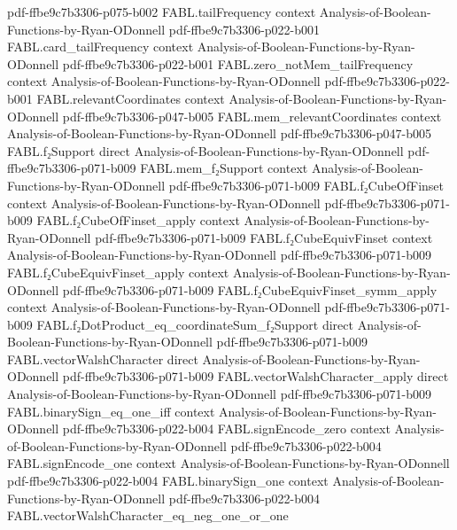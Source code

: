 \begin{theorem}
  {pdf-ffbe9c7b3306-p075-b002}
\proofstep
  {FABL.tailFrequency}
  {context}
  {Analysis-of-Boolean-Functions-by-Ryan-ODonnell}
  {pdf-ffbe9c7b3306-p022-b001}
\proofstep
  {FABL.card_tailFrequency}
  {context}
  {Analysis-of-Boolean-Functions-by-Ryan-ODonnell}
  {pdf-ffbe9c7b3306-p022-b001}
\proofstep
  {FABL.zero_notMem_tailFrequency}
  {context}
  {Analysis-of-Boolean-Functions-by-Ryan-ODonnell}
  {pdf-ffbe9c7b3306-p022-b001}
\proofstep
  {FABL.relevantCoordinates}
  {context}
  {Analysis-of-Boolean-Functions-by-Ryan-ODonnell}
  {pdf-ffbe9c7b3306-p047-b005}
\proofstep
  {FABL.mem_relevantCoordinates}
  {context}
  {Analysis-of-Boolean-Functions-by-Ryan-ODonnell}
  {pdf-ffbe9c7b3306-p047-b005}
\proofstep
  {FABL.f₂Support}
  {direct}
  {Analysis-of-Boolean-Functions-by-Ryan-ODonnell}
  {pdf-ffbe9c7b3306-p071-b009}
\proofstep
  {FABL.mem_f₂Support}
  {context}
  {Analysis-of-Boolean-Functions-by-Ryan-ODonnell}
  {pdf-ffbe9c7b3306-p071-b009}
\proofstep
  {FABL.f₂CubeOfFinset}
  {context}
  {Analysis-of-Boolean-Functions-by-Ryan-ODonnell}
  {pdf-ffbe9c7b3306-p071-b009}
\proofstep
  {FABL.f₂CubeOfFinset_apply}
  {context}
  {Analysis-of-Boolean-Functions-by-Ryan-ODonnell}
  {pdf-ffbe9c7b3306-p071-b009}
\proofstep
  {FABL.f₂CubeEquivFinset}
  {context}
  {Analysis-of-Boolean-Functions-by-Ryan-ODonnell}
  {pdf-ffbe9c7b3306-p071-b009}
\proofstep
  {FABL.f₂CubeEquivFinset_apply}
  {context}
  {Analysis-of-Boolean-Functions-by-Ryan-ODonnell}
  {pdf-ffbe9c7b3306-p071-b009}
\proofstep
  {FABL.f₂CubeEquivFinset_symm_apply}
  {context}
  {Analysis-of-Boolean-Functions-by-Ryan-ODonnell}
  {pdf-ffbe9c7b3306-p071-b009}
\proofstep
  {FABL.f₂DotProduct_eq_coordinateSum_f₂Support}
  {direct}
  {Analysis-of-Boolean-Functions-by-Ryan-ODonnell}
  {pdf-ffbe9c7b3306-p071-b009}
\proofstep
  {FABL.vectorWalshCharacter}
  {direct}
  {Analysis-of-Boolean-Functions-by-Ryan-ODonnell}
  {pdf-ffbe9c7b3306-p071-b009}
\proofstep
  {FABL.vectorWalshCharacter_apply}
  {direct}
  {Analysis-of-Boolean-Functions-by-Ryan-ODonnell}
  {pdf-ffbe9c7b3306-p071-b009}
\proofstep
  {FABL.binarySign_eq_one_iff}
  {context}
  {Analysis-of-Boolean-Functions-by-Ryan-ODonnell}
  {pdf-ffbe9c7b3306-p022-b004}
\proofstep
  {FABL.signEncode_zero}
  {context}
  {Analysis-of-Boolean-Functions-by-Ryan-ODonnell}
  {pdf-ffbe9c7b3306-p022-b004}
\proofstep
  {FABL.signEncode_one}
  {context}
  {Analysis-of-Boolean-Functions-by-Ryan-ODonnell}
  {pdf-ffbe9c7b3306-p022-b004}
\proofstep
  {FABL.binarySign_one}
  {context}
  {Analysis-of-Boolean-Functions-by-Ryan-ODonnell}
  {pdf-ffbe9c7b3306-p022-b004}
\proofstep
  {FABL.vectorWalshCharacter_eq_neg_one_or_one}

\end{theorem}
